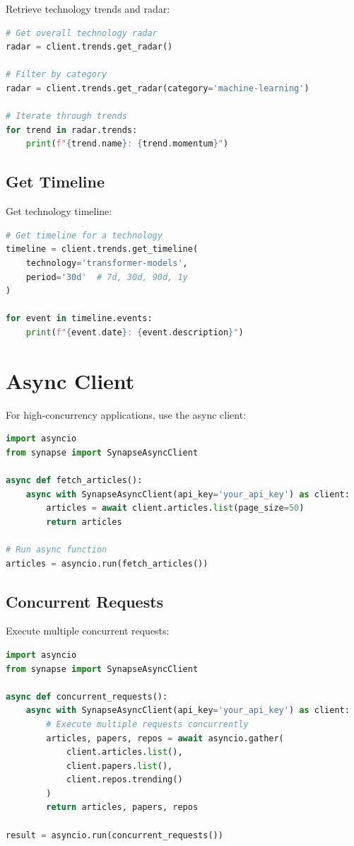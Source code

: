 \documentclass{report}
\begin{document}
Retrieve technology trends and radar:

\begin{lstlisting}[language=Python]
# Get overall technology radar
radar = client.trends.get_radar()

# Filter by category
radar = client.trends.get_radar(category='machine-learning')

# Iterate through trends
for trend in radar.trends:
    print(f"{trend.name}: {trend.momentum}")
\end{lstlisting}

\subsection{Get Timeline}

Get technology timeline:

\begin{lstlisting}[language=Python]
# Get timeline for a technology
timeline = client.trends.get_timeline(
    technology='transformer-models',
    period='30d'  # 7d, 30d, 90d, 1y
)

for event in timeline.events:
    print(f"{event.date}: {event.description}")
\end{lstlisting}

\section{Async Client}

For high-concurrency applications, use the async client:

\begin{lstlisting}[language=Python]
import asyncio
from synapse import SynapseAsyncClient

async def fetch_articles():
    async with SynapseAsyncClient(api_key='your_api_key') as client:
        articles = await client.articles.list(page_size=50)
        return articles

# Run async function
articles = asyncio.run(fetch_articles())
\end{lstlisting}

\subsection{Concurrent Requests}

Execute multiple concurrent requests:

\begin{lstlisting}[language=Python]
import asyncio
from synapse import SynapseAsyncClient

async def concurrent_requests():
    async with SynapseAsyncClient(api_key='your_api_key') as client:
        # Execute multiple requests concurrently
        articles, papers, repos = await asyncio.gather(
            client.articles.list(),
            client.papers.list(),
            client.repos.trending()
        )
        return articles, papers, repos

result = asyncio.run(concurrent_requests())
\end{lstlisting}
\end{document}
